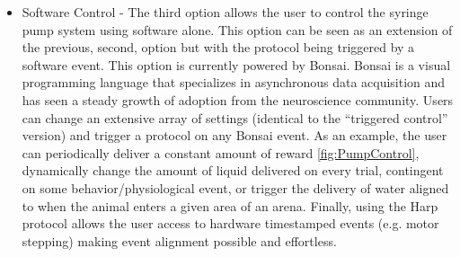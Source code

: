 \begin{itemize}
\item{Software Control} - The third option allows the user to control the syringe pump system using software alone. This option can be seen as an extension of the previous, second, option but with the protocol being triggered by a software event. This option is currently powered by Bonsai. Bonsai is a visual programming language that specializes in asynchronous data acquisition and has seen a steady growth of adoption from the neuroscience community. Users can change an extensive array of settings (identical to the “triggered control” version) and trigger a protocol on any Bonsai event. As an example, the user can periodically deliver a constant amount of reward \ref{fig:PumpControl}, dynamically change the amount of liquid delivered on every trial, contingent on some behavior/physiological event, or trigger the delivery of water aligned to when the animal enters a given area of an arena.
Finally, using the Harp protocol allows the user access to hardware timestamped events (e.g. motor stepping) making event alignment possible and effortless.



\end{itemize}
